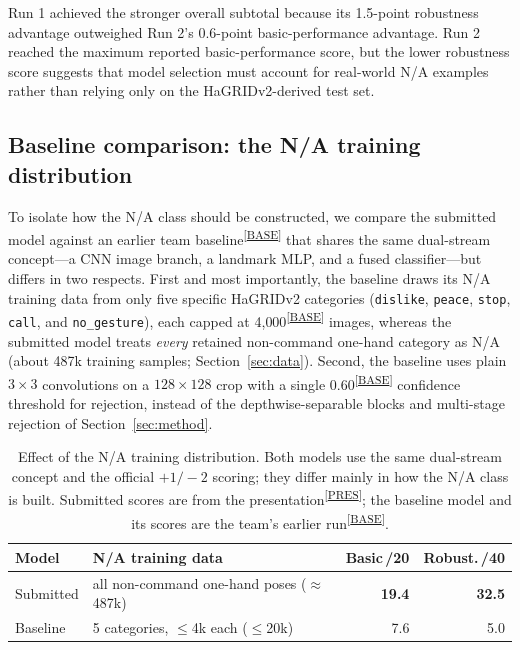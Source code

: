 \documentclass[10pt,twocolumn,a4paper]{article}
\newcommand{\evidence}[1]{\textsuperscript{\scriptsize[\hyperref[ev:#1]{#1}]}}
\newcommand{\result}[2]{#1\evidence{#2}}
\begin{document}
Run 1 achieved the stronger overall subtotal because its 1.5-point robustness
advantage outweighed Run 2's 0.6-point basic-performance advantage. Run 2
reached the maximum reported basic-performance score, but the lower robustness
score suggests that model selection must account for real-world N/A examples
rather than relying only on the HaGRIDv2-derived test set.

\subsection{Baseline comparison: the N/A training distribution}
\label{sec:baseline}

To isolate how the N/A class should be constructed, we compare the submitted
model against an earlier team baseline\evidence{BASE} that shares the same
dual-stream concept---a CNN image branch, a landmark MLP, and a fused
classifier---but differs in two respects. First and most importantly, the
baseline draws its N/A training data from only five specific HaGRIDv2
categories (\texttt{dislike}, \texttt{peace}, \texttt{stop}, \texttt{call},
and \texttt{no\_gesture}), each capped at \result{4{,}000}{BASE} images,
whereas the submitted model treats \emph{every} retained non-command one-hand
category as N/A (about 487k training samples; Section~\ref{sec:data}). Second,
the baseline uses plain $3\times3$ convolutions on a $128\times128$ crop with a
single \result{0.60}{BASE} confidence threshold for rejection, instead of the
depthwise-separable blocks and multi-stage rejection of
Section~\ref{sec:method}.

\begin{table}[t]
  \centering
  \caption{Effect of the N/A training distribution. Both models use the same
  dual-stream concept and the official $+1/-2$ scoring; they differ mainly in
  how the N/A class is built. Submitted scores are from the
  presentation\evidence{PRES}; the baseline model and its scores are the team's
  earlier run\evidence{BASE}.}
  \label{tab:baseline}
  \small
  \setlength{\tabcolsep}{4pt}
  \begin{tabular}{@{}lp{}rr@{}}
    \toprule
    Model & N/A training data & Basic\,/20 & Robust.\,/40 \\
    \midrule
    Submitted & all non-command one-hand poses ($\approx$487k)
              & \textbf{19.4} & \textbf{32.5} \\
    Baseline  & 5 categories, $\le$4k each ($\le$20k)
              & 7.6 & 5.0 \\
    \bottomrule
  \end{tabular}
\end{table}
\end{document}
